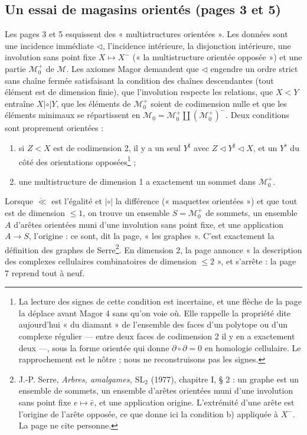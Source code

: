 \documentclass[11pt,a4paper]{article}
\begin{document}
\subsection*{Un essai de magasins orientés (pages 3 et 5)}

Les pages 3 et 5 esquissent des « multistructures orientées ». Les données sont
une incidence immédiate $\lhd$, l'incidence intérieure, la disjonction
intérieure, une involution sans point fixe $X \mapsto X^{-}$ (« la
multistructure orientée opposée ») et une partie $\mathcal{M}_{0}^{+}$ de
$\mathcal{M}$. Les axiomes Magor demandent que $\lhd$ engendre un ordre strict
sans chaîne fermée satisfaisant la condition des chaînes descendantes (tout
élément est de dimension finie), que l'involution respecte les relations, que
$X < Y$ entraîne $X \mathrel{|\circ|} Y$, que les éléments de
$\mathcal{M}_{0}^{+}$ soient de codimension nulle et que les éléments minimaux
se répartissent en $\mathcal{M}_{0} = \mathcal{M}_{0}^{+} \amalg
(\mathcal{M}_{0}^{+})^{-}$. Deux conditions sont proprement orientées :
\begin{enumerate}
\item[a)] si $Z < X$ est de codimension 2, il y a un seul $Y^{\sharp}$ avec $Z
\lhd Y^{\sharp} \lhd X$, et un $Y^{\flat}$ du côté des orientations
opposées\footnote{La lecture des signes de cette condition est incertaine, et
une flèche de la page la déplace avant Magor 4 sans qu'on voie où. Elle
rappelle la propriété dite aujourd'hui « du diamant » de l'ensemble des faces
d'un polytope ou d'un complexe régulier --- entre deux faces de codimension 2
il y en a exactement deux ---, sous la forme orientée qui donne $\partial \circ
\partial = 0$ en homologie cellulaire. Le rapprochement est le nôtre ; nous ne
reconstruisons pas les signes.} ;
\item[b)] une multistructure de dimension 1 a exactement un sommet dans
$\mathcal{M}_{0}^{+}$.
\end{enumerate}
Lorsque $\mathring{\ll}$ est l'égalité et $\mathrel{|\circ|}$ la différence
(« maquettes orientées ») et que tout est de dimension $\leq 1$, on trouve un
ensemble $S = \mathcal{M}_{0}^{+}$ de sommets, un ensemble $A$ d'arêtes
orientées muni d'une involution sans point fixe, et une application $A \to S$,
l'origine : ce sont, dit la page, « les graphes ». C'est exactement la
définition des graphes de Serre\footnote{J.-P. Serre, \emph{Arbres, amalgames,
$\mathrm{SL}_{2}$} (1977), chapitre I, § 2 : un graphe est un ensemble de
sommets, un ensemble d'arêtes orientées muni d'une involution sans point fixe
$e \mapsto \bar{e}$, et une application origine. L'extrémité d'une arête est
l'origine de l'arête opposée, ce que donne ici la condition b) appliquée à
$X^{-}$. La page ne cite personne.}. En dimension 2, la page annonce « la
description des complexes cellulaires combinatoires de dimension $\leq 2$ », et
s'arrête : la page 7 reprend tout à neuf.
\end{document}
